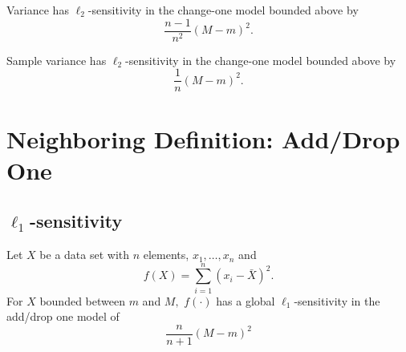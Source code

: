 \documentclass[11pt]{scrartcl} %
\begin{document}
\begin{corollary}
Variance has $\ell_2$-sensitivity in the change-one model bounded above by
$$ \frac{n-1}{n^2} (M-m)^2.$$ 
\end{corollary}

\begin{corollary}
Sample variance has $\ell_2$-sensitivity in the change-one model bounded above by
$$ \frac{1}{n} (M-m)^2.$$ 
\end{corollary}


\section{Neighboring Definition: Add/Drop One}
\subsection{$\ell_1$-sensitivity}
 \begin{theorem}
 \label{thm:l1addsub}
 	Let $X$ be a data set with $n$ elements, $x_1, \hdots, x_n$ and
 	\[ f(X) = \sum_{i=1}^n (x_i - \bar{X})^2. \]
 	For $X$ bounded between $m$ and $M,$ $f(\cdot)$ has a global $\ell_1$-sensitivity in the add/drop one model of
 	\[ \frac{n}{n+1} (M-m)^2 \]
 \end{theorem}
\end{document}
